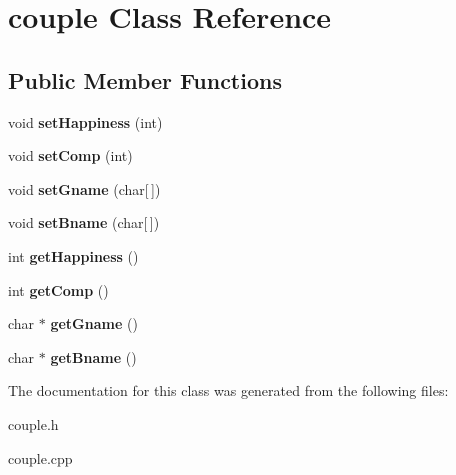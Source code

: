 \hypertarget{classcouple}{}\section{couple Class Reference}
\label{classcouple}
\subsection*{Public Member Functions}
\begin{DoxyCompactItemize}
\item 
void {\bfseries set\+Happiness} (int)\hypertarget{classcouple_adf86e6298e1d89f2cd57a61079aa948f}{}\label{classcouple_adf86e6298e1d89f2cd57a61079aa948f}

\item 
void {\bfseries set\+Comp} (int)\hypertarget{classcouple_ac80a55319cee46a766e44189510089ab}{}\label{classcouple_ac80a55319cee46a766e44189510089ab}

\item 
void {\bfseries set\+Gname} (char\mbox{[}$\,$\mbox{]})\hypertarget{classcouple_a8438d21d7fdf9a14378b27cdf014f301}{}\label{classcouple_a8438d21d7fdf9a14378b27cdf014f301}

\item 
void {\bfseries set\+Bname} (char\mbox{[}$\,$\mbox{]})\hypertarget{classcouple_ab9f947ff102340e327815274005ade2d}{}\label{classcouple_ab9f947ff102340e327815274005ade2d}

\item 
int {\bfseries get\+Happiness} ()\hypertarget{classcouple_a31d0a1c8acff06a64ebc2e2f6d9a68b1}{}\label{classcouple_a31d0a1c8acff06a64ebc2e2f6d9a68b1}

\item 
int {\bfseries get\+Comp} ()\hypertarget{classcouple_aef72f8239b6da040fa6bb2b76427dda0}{}\label{classcouple_aef72f8239b6da040fa6bb2b76427dda0}

\item 
char $\ast$ {\bfseries get\+Gname} ()\hypertarget{classcouple_a3cfef64a106342e41d568ee65d606735}{}\label{classcouple_a3cfef64a106342e41d568ee65d606735}

\item 
char $\ast$ {\bfseries get\+Bname} ()\hypertarget{classcouple_afaa89e1c44563752192d7990702a7839}{}\label{classcouple_afaa89e1c44563752192d7990702a7839}

\end{DoxyCompactItemize}


The documentation for this class was generated from the following files\+:\begin{DoxyCompactItemize}
\item 
couple.\+h\item 
couple.\+cpp\end{DoxyCompactItemize}
